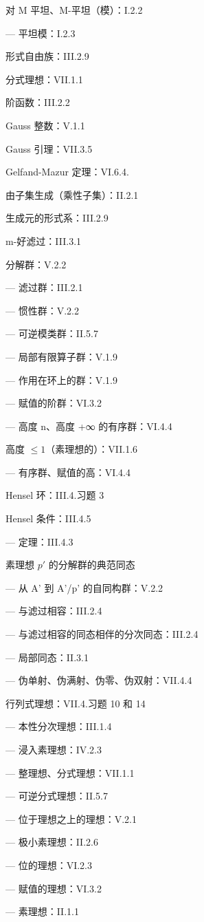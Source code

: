 对 M 平坦、M-平坦（模）：I.2.2

--- 平坦模：I.2.3

形式自由族：III.2.9

分式理想：VII.1.1

阶函数：III.2.2

Gauss 整数：V.1.1

Gauss 引理：VII.3.5

Gelfand-Mazur 定理：VI.6.4.

由子集生成（乘性子集）：II.2.1

生成元的形式系：III.2.9

m-好滤过：III.3.1

分解群：V.2.2

--- 滤过群：III.2.1

--- 惯性群：V.2.2

--- 可逆模类群：II.5.7

--- 局部有限算子群：V.1.9

--- 作用在环上的群：V.1.9

--- 赋值的阶群：VI.3.2

--- 高度 n、高度 +∞ 的有序群：VI.4.4

高度 \(\leqslant 1\)（素理想的）：VII.1.6

--- 有序群、赋值的高：VI.4.4

Hensel 环：III.4.习题 3

Hensel 条件：III.4.5

--- 定理：III.4.3

素理想 \(p'\) 的分解群的典范同态

--- 从 A' 到 A'/p' 的自同构群：V.2.2

--- 与滤过相容：III.2.4

--- 与滤过相容的同态相伴的分次同态：III.2.4

--- 局部同态：II.3.1

--- 伪单射、伪满射、伪零、伪双射：VII.4.4

行列式理想：VII.4.习题 10 和 14

--- 本性分次理想：III.1.4

--- 浸入素理想：IV.2.3

--- 整理想、分式理想：VII.1.1

--- 可逆分式理想：II.5.7

--- 位于理想之上的理想：V.2.1

--- 极小素理想：II.2.6

--- 位的理想：VI.2.3

--- 赋值的理想：VI.3.2

--- 素理想：II.1.1

